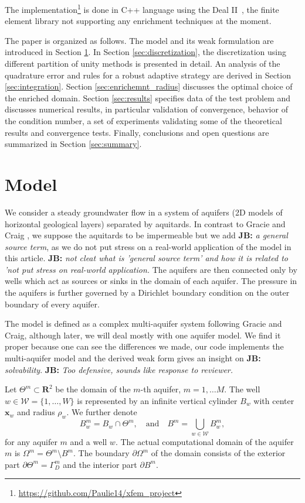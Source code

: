 \documentclass{elsarticle}
\def\vc#1{\mathbf{\boldsymbol{#1}}}     %
\newcommand{\R}{\mathbf{R}}
\newcommand{\noteJB}[1]{{\color{Blue} \textbf{JB: } \textit{#1}}}
\begin{document}
The implementation\footnote{\url{https://github.com/Paulie14/xfem_project}}  is done in C++ language using the Deal II~\cite{bangerth_deal.ii_2007}, the finite element library
not supporting any enrichment techniques at the moment. 


The paper is organized as follows. The model and its weak formulation are introduced in Section \ref{sec:model}.
In Section \ref{sec:discretization}, the discretization using different partition of unity methods is presented in detail.
An analysis of the quadrature error and rules for a robust adaptive strategy are derived in Section \ref{sec:integration}.
Section \ref{sec:enrichemnt_radius} discusses the optimal choice of the enriched domain.
Section \ref{sec:results} specifies data of the test problem and discusses numerical results,
in particular validation of convergence, behavior of the condition number, a set of experiments validating some of the theoretical results and convergence tests.
Finally, conclusions and open questions are summarized in Section \ref{sec:summary}.

\section{Model}
\label{sec:model}
We consider a steady groundwater 
flow in a system of aquifers (2D models of horizontal geological layers) separated by aquitards. 
In contrast to Gracie and Craig \cite{gracie_modelling_2010}, we suppose the aquitards to be impermeable but we add \noteJB{a general source term}, 
as we do not put stress on a real-world application of the model in this article. \noteJB{not cleat what is 'general source term' and how it is related
to 'not put stress on real-world application.} The aquifers are then connected only by wells 
which act as sources or sinks in the domain of each aquifer. The pressure in the aquifers is further governed 
by a Dirichlet boundary condition on the outer boundary of every aquifer.

The model is defined as a complex multi-aquifer system following Gracie and Craig,
although later, we will deal mostly with one aquifer model.
We find it proper because one can see the differences we made, our code implements the multi-aquifer model and
the derived weak form gives an insight on \noteJB{solvability}. \noteJB{Too defensive, sounds like response to reviewer.}

Let $\Theta^m\subset \R^2$ be the domain of the $m$-th aquifer, $m=1,\ldots M$.
The well $w\in\mathcal{W}=\{1,\ldots,W\}$ is represented by an infinite vertical cylinder $B_w$
with center $\vc{x}_w$ and radius $\rho_w$.  We further denote 
\[
 B^m_w = B_w \cap \Theta^m, \quad \text{and} \quad
 B^m=\bigcup_{w\in \mathcal{W}}B^m_w,
\]
for any aquifer $m$ and a well $w$.
The actual computational domain of the aquifer $m$ is $\Omega^m = \Theta^m\setminus B^m$. The boundary $\partial\Omega^m$ of 
the domain consists of the exterior part $\partial\Theta^m=\Gamma^m_D$ and the interior part $\partial B^m$.
\end{document}
